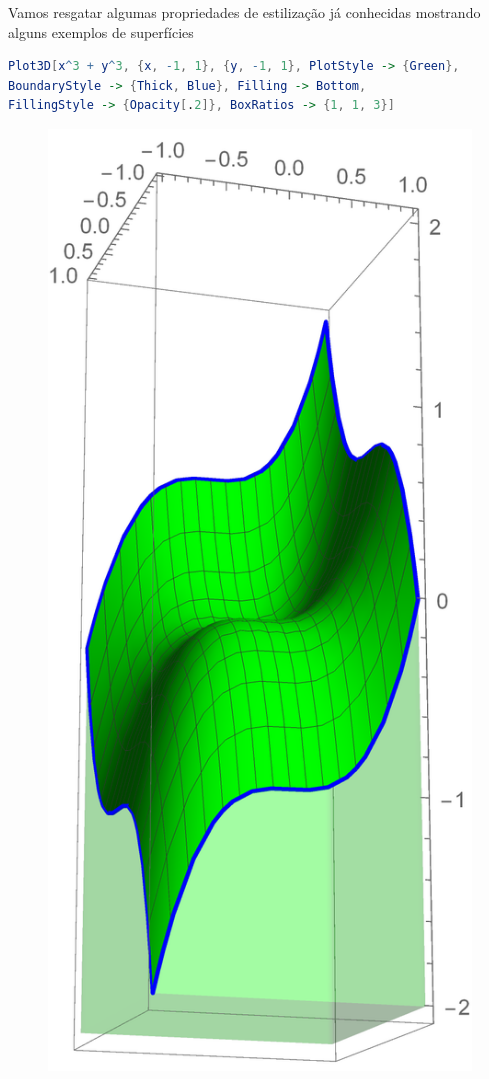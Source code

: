 \documentclass[a4paper, 12pt]{article}
\begin{document}
\begin{itemize}
			Vamos resgatar algumas propriedades de estilização já conhecidas mostrando alguns exemplos de superfícies 

\begin{lstlisting}[language=Mathematica]
Plot3D[x^3 + y^3, {x, -1, 1}, {y, -1, 1}, PlotStyle -> {Green}, 
BoundaryStyle -> {Thick, Blue}, Filling -> Bottom, 
FillingStyle -> {Opacity[.2]}, BoxRatios -> {1, 1, 3}]
\end{lstlisting}

			\begin{figure}[!h]
				\centering
				\includegraphics[scale=.3]{images/PlotStyle3d2}
			\end{figure}


\end{itemize}
\end{document}
